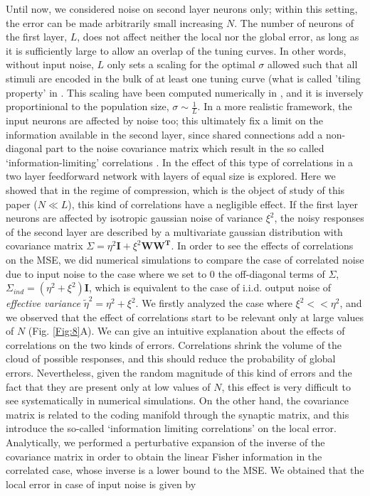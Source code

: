 \documentclass[a4paper]{article}
\begin{document}
Until now, we considered noise on second layer neurons only; within this setting, the error can be made arbitrarily small increasing $N$. The number of neurons of the first layer, $L$, does not affect neither the local nor the global error, as long as it is sufficiently large to allow an overlap of the tuning curves. In other words, without input noise, $L$ only sets a scaling for the optimal $\sigma$ allowed such that all stimuli are encoded in the bulk of at least one tuning curve (what is called 'tiling property' in \cite{Ganguli2014EfficientPopulations,Wei2013TheE}. This scaling have been computed numerically in  \cite{Berens2011ReassessingFunctions}, and it is inversely proportinional to the population size, $\sigma \sim \frac{1}{L}$.
In a more realistic framework, the input neurons are affected by noise too; this ultimately fix a limit on the information available in the second layer, since shared connections add a non-diagonal part to the noise covariance matrix which result in the so called `information-limiting' correlations \cite[]{Moreno-Bote2014Information-limitingCorrelations}.  In \cite{Pernice2018InterpretationCircuits} the effect of this type of correlations in a two layer feedforward network with layers of equal size is explored. Here we showed that in the regime of compression, which is the object of study of this paper ($N \ll L$), this kind of correlations have a negligible effect. If the first layer neurons are affected by isotropic gaussian noise of variance $\xi^2$, the noisy responses of the second layer are described by a multivariate gaussian distribution with covariance matrix $\Sigma = \eta^2\mathbf{I}+ \xi^2 \mathbf{WW^T}.$  In order to see the effects of correlations on the MSE, we did numerical simulations to compare the case of correlated noise due to input noise to the case where we set to $0$ the off-diagonal terms of $\Sigma$, $\Sigma_{ind} = (\eta^2 + \xi^2)\mathbf{I}$, which is equivalent to the case of i.i.d. output noise of \textit{effective variance} $\tilde\eta^2 = \eta^2 + \xi^2$. We firstly analyzed the case where $\xi^2 <<  \eta^2$, and we observed that the effect of correlations start to be relevant only at large values of $N$ (Fig. \ref{Fig:8}A). We can give an intuitive explanation about the effects of correlations on the two kinds of errors. Correlations shrink the volume of the cloud of possible responses, and this should reduce the probability of global errors. Nevertheless, given the random magnitude of this kind of errors and the fact that they are present only at low values of $N$, this effect is very difficult to see systematically in numerical simulations. On the other hand, the covariance matrix is related to the coding manifold through the synaptic matrix, and this introduce the so-called `information limiting correlations' on the local error. Analytically, we performed a perturbative expansion of the inverse of the covariance matrix in order to obtain the linear Fisher information in the correlated case, whose inverse is a lower bound to the MSE. We obtained that the local error in case of input noise is given by
\end{document}
